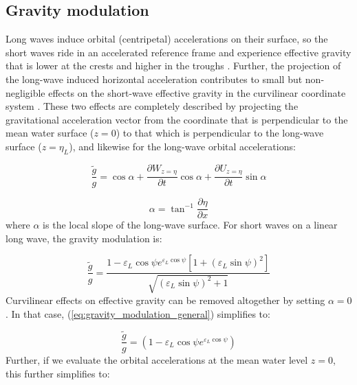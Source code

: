 \documentclass[lineno]{jfm}
\begin{document}
\subsection{Gravity modulation}
\label{subsection:gravity_modulation}

Long waves induce orbital (centripetal) accelerations on their surface, so the
short waves ride in an accelerated reference frame and experience effective
gravity that is lower at the crests and higher in the troughs
\citep{longuet1986eulerian,longuet1987propagation}.
Further, the projection of the long-wave induced horizontal acceleration
contributes to small but non-negligible effects on the short-wave effective
gravity in the curvilinear coordinate system
\citep{phillips1981dispersion,zhang1990evolution}.
These two effects are completely described by projecting the gravitational
acceleration vector from the coordinate that is perpendicular to the mean water
surface ($z=0$) to that which is perpendicular to the long-wave surface
($z=\eta_L$), and likewise for the long-wave orbital accelerations:

\begin{equation}
\label{eq:gravity_modulation_general}
\frac{\widetilde{g}}{g}
  = \cos{\alpha} 
  + \dfrac{\partial W_{z=\eta}}{\partial t} \cos{\alpha}
  + \dfrac{\partial U_{z=\eta}}{\partial t} \sin{\alpha}
\end{equation}

\begin{equation}
\label{eq:local_slope}
\alpha = \tan^{-1}{\dfrac{\partial \eta}{\partial x}}
\end{equation}
where $\alpha$ is the local slope of the long-wave surface.
For short waves on a linear long wave, the gravity modulation is:

\begin{equation}
\label{eq:gravity_modulation_linear}
\frac{\widetilde{g}}{g}
  = 
  \frac{
    1 - \varepsilon_L \cos{\psi} e^{\varepsilon_L \cos{\psi}}
    \left[ 1 + \left(\varepsilon_L \sin{\psi}\right)^2 \right]
  }
  {\sqrt{\left(\varepsilon_L \sin{\psi}\right)^2 + 1}}
\end{equation}
Curvilinear effects on effective gravity can be removed altogether by setting
$\alpha = 0$.
In that case, (\ref{eq:gravity_modulation_general}) simplifies to:

\begin{equation}
\label{eq:gravity_modulation_linear_no_curvature}
\frac{\widetilde{g}}{g} = \left( 1 - \varepsilon_L \cos{\psi} e^{\varepsilon_L \cos{\psi}} \right)
\end{equation}
Further, if we evaluate the orbital accelerations at the mean water level $z=0$,
this further simplifies to:
\end{document}
